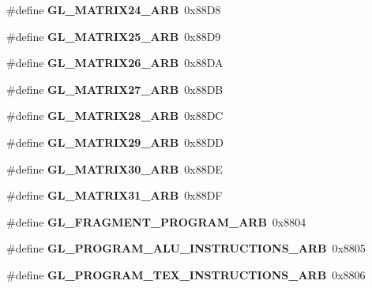 \begin{DoxyCompactItemize}
\item 
\#define {\bfseries G\+L\+\_\+\+M\+A\+T\+R\+I\+X24\+\_\+\+A\+R\+B}~0x88\+D8\label{_s_d_l__opengl_8h_ae2d7a57b63a1fecb0f56a71aeb32ca3b}

\item 
\#define {\bfseries G\+L\+\_\+\+M\+A\+T\+R\+I\+X25\+\_\+\+A\+R\+B}~0x88\+D9\label{_s_d_l__opengl_8h_ab4c76b22cd476dfa6d4dd142c099b777}

\item 
\#define {\bfseries G\+L\+\_\+\+M\+A\+T\+R\+I\+X26\+\_\+\+A\+R\+B}~0x88\+D\+A\label{_s_d_l__opengl_8h_a7fd4a96db77788c1080f951d1576ff13}

\item 
\#define {\bfseries G\+L\+\_\+\+M\+A\+T\+R\+I\+X27\+\_\+\+A\+R\+B}~0x88\+D\+B\label{_s_d_l__opengl_8h_ad8cb865d9795665a3252fc948ac3719f}

\item 
\#define {\bfseries G\+L\+\_\+\+M\+A\+T\+R\+I\+X28\+\_\+\+A\+R\+B}~0x88\+D\+C\label{_s_d_l__opengl_8h_ad05c6269412c87966c4a5f93f96819a5}

\item 
\#define {\bfseries G\+L\+\_\+\+M\+A\+T\+R\+I\+X29\+\_\+\+A\+R\+B}~0x88\+D\+D\label{_s_d_l__opengl_8h_a5cb423b0cbe5e85e2152fff61410ed7c}

\item 
\#define {\bfseries G\+L\+\_\+\+M\+A\+T\+R\+I\+X30\+\_\+\+A\+R\+B}~0x88\+D\+E\label{_s_d_l__opengl_8h_a149b40e267b65dce7ee0384c4806974f}

\item 
\#define {\bfseries G\+L\+\_\+\+M\+A\+T\+R\+I\+X31\+\_\+\+A\+R\+B}~0x88\+D\+F\label{_s_d_l__opengl_8h_ab3ab477e830655dba6eeac67b633f15f}

\item 
\#define {\bfseries G\+L\+\_\+\+F\+R\+A\+G\+M\+E\+N\+T\+\_\+\+P\+R\+O\+G\+R\+A\+M\+\_\+\+A\+R\+B}~0x8804\label{_s_d_l__opengl_8h_a3752d06345bf9b7cd556c8c18f1af1df}

\item 
\#define {\bfseries G\+L\+\_\+\+P\+R\+O\+G\+R\+A\+M\+\_\+\+A\+L\+U\+\_\+\+I\+N\+S\+T\+R\+U\+C\+T\+I\+O\+N\+S\+\_\+\+A\+R\+B}~0x8805\label{_s_d_l__opengl_8h_a5eb810f874fa3cece06a685d2c5b18b6}

\item 
\#define {\bfseries G\+L\+\_\+\+P\+R\+O\+G\+R\+A\+M\+\_\+\+T\+E\+X\+\_\+\+I\+N\+S\+T\+R\+U\+C\+T\+I\+O\+N\+S\+\_\+\+A\+R\+B}~0x8806\label{_s_d_l__opengl_8h_abce582cf2d6e50b709dde2865a3ac313}


\end{DoxyCompactItemize}
